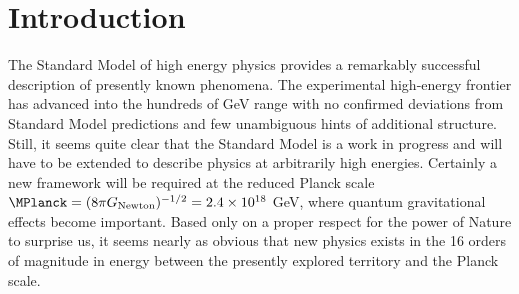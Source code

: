 \maketitle{}

\tableofcontents
\section{Introduction}\label{sec:intro}
\setcounter{equation}{0}
\setcounter{footnote}{1}

The Standard Model of high energy physics provides a remarkably successful
description of presently known phenomena. The experimental
high-energy frontier has advanced into the hundreds of GeV range
with no confirmed deviations from Standard Model predictions
and few unambiguous hints of additional structure. Still, it seems quite
clear that the Standard Model
is a work in progress and will have to be extended to
describe physics at arbitrarily high energies.
Certainly a new framework will be required at
the reduced Planck scale
$\MPlanck = (8 \pi G_{\rm Newton})^{-1/2}
=
2.4 \times 10^{18}$ GeV, where quantum gravitational effects become
important. Based only on a proper respect
for the power of Nature to surprise us, it seems nearly as obvious that
new physics exists in the 16 orders of magnitude in energy between
the presently explored territory and the Planck scale.

